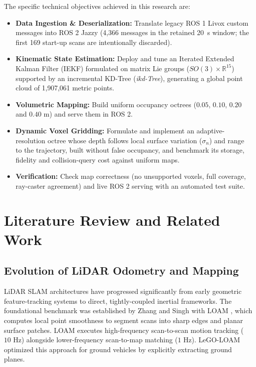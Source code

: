 \documentclass[11pt,a4paper]{report}
\begin{document}
The specific technical objectives achieved in this research are:
\begin{itemize}
    \item \textbf{Data Ingestion \& Deserialization:} Translate legacy ROS 1 Livox custom messages into ROS 2 Jazzy (4,366 messages in the retained 20~s window; the first 169 start-up scans are intentionally discarded).
    \item \textbf{Kinematic State Estimation:} Deploy and tune an Iterated Extended Kalman Filter (IEKF) formulated on matrix Lie groups ($SO(3) \times \mathbb{R}^{15}$) supported by an incremental KD-Tree (\textit{ikd-Tree}), generating a global point cloud of 1,907,061 metric points.
    \item \textbf{Volumetric Mapping:} Build uniform occupancy octrees ($0.05$, $0.10$, $0.20$ and $0.40\text{ m}$) and serve them in ROS 2.
    \item \textbf{Dynamic Voxel Gridding:} Formulate and implement an adaptive-resolution octree whose depth follows local surface variation ($\sigma_n$) and range to the trajectory, built without false occupancy, and benchmark its storage, fidelity and collision-query cost against uniform maps.
    \item \textbf{Verification:} Check map correctness (no unsupported voxels, full coverage, ray-caster agreement) and live ROS 2 serving with an automated test suite.
\end{itemize}

\newpage

\chapter{Literature Review and Related Work}

\section{Evolution of LiDAR Odometry and Mapping}
LiDAR SLAM architectures have progressed significantly from early geometric feature-tracking systems to direct, tightly-coupled inertial frameworks. The foundational benchmark was established by Zhang and Singh with LOAM \cite{zhang2014loam}, which computes local point smoothness to segment scans into sharp edges and planar surface patches. LOAM executes high-frequency scan-to-scan motion tracking ($10\text{ Hz}$) alongside lower-frequency scan-to-map matching ($1\text{ Hz}$). LeGO-LOAM \cite{shan2018legoloam} optimized this approach for ground vehicles by explicitly extracting ground planes.
\end{document}
